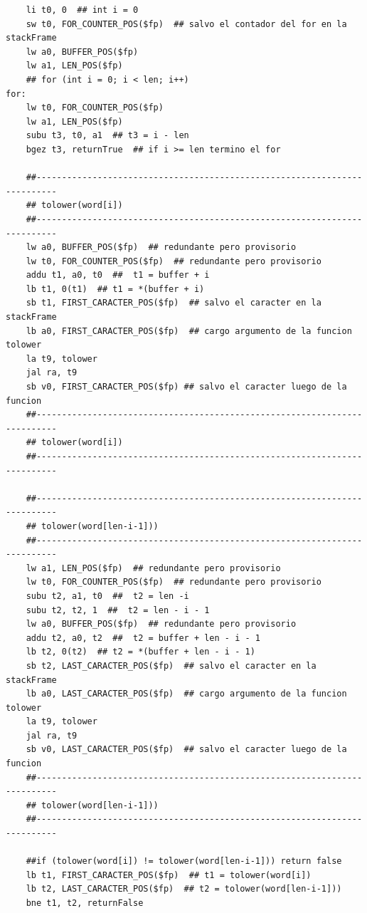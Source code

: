 \documentclass[a4paper,10pt]{article}
\begin{document}
\begin{lstlisting}
    li t0, 0  ## int i = 0
    sw t0, FOR_COUNTER_POS($fp)  ## salvo el contador del for en la stackFrame
    lw a0, BUFFER_POS($fp)
    lw a1, LEN_POS($fp)
    ## for (int i = 0; i < len; i++)
for:
    lw t0, FOR_COUNTER_POS($fp)
    lw a1, LEN_POS($fp)
    subu t3, t0, a1  ## t3 = i - len
    bgez t3, returnTrue  ## if i >= len termino el for

    ##--------------------------------------------------------------------------
    ## tolower(word[i])
    ##--------------------------------------------------------------------------
    lw a0, BUFFER_POS($fp)  ## redundante pero provisorio
    lw t0, FOR_COUNTER_POS($fp)  ## redundante pero provisorio
    addu t1, a0, t0  ##  t1 = buffer + i
    lb t1, 0(t1)  ## t1 = *(buffer + i)
    sb t1, FIRST_CARACTER_POS($fp)  ## salvo el caracter en la stackFrame
    lb a0, FIRST_CARACTER_POS($fp)  ## cargo argumento de la funcion tolower
    la t9, tolower
    jal ra, t9
    sb v0, FIRST_CARACTER_POS($fp) ## salvo el caracter luego de la funcion
    ##--------------------------------------------------------------------------
    ## tolower(word[i])
    ##--------------------------------------------------------------------------

    ##--------------------------------------------------------------------------
    ## tolower(word[len-i-1]))
    ##--------------------------------------------------------------------------
    lw a1, LEN_POS($fp)  ## redundante pero provisorio
    lw t0, FOR_COUNTER_POS($fp)  ## redundante pero provisorio
    subu t2, a1, t0  ##  t2 = len -i
    subu t2, t2, 1  ##  t2 = len - i - 1
    lw a0, BUFFER_POS($fp)  ## redundante pero provisorio
    addu t2, a0, t2  ##  t2 = buffer + len - i - 1
    lb t2, 0(t2)  ## t2 = *(buffer + len - i - 1)
    sb t2, LAST_CARACTER_POS($fp)  ## salvo el caracter en la stackFrame
    lb a0, LAST_CARACTER_POS($fp)  ## cargo argumento de la funcion tolower
    la t9, tolower
    jal ra, t9
    sb v0, LAST_CARACTER_POS($fp)  ## salvo el caracter luego de la funcion
    ##--------------------------------------------------------------------------
    ## tolower(word[len-i-1]))
    ##--------------------------------------------------------------------------

    ##if (tolower(word[i]) != tolower(word[len-i-1])) return false
    lb t1, FIRST_CARACTER_POS($fp)  ## t1 = tolower(word[i])
    lb t2, LAST_CARACTER_POS($fp)  ## t2 = tolower(word[len-i-1]))
    bne t1, t2, returnFalse


\end{lstlisting}
\end{document}
